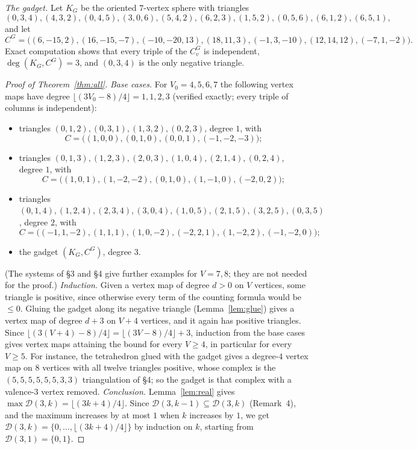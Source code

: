 \documentclass[11pt]{amsart}
\theoremstyle{remark}
\begin{document}
\emph{The gadget.} Let $K_G$ be the oriented $7$-vertex sphere with triangles
\[
(0,3,4),(4,3,2),(0,4,5),(3,0,6),(5,4,2),(6,2,3),(1,5,2),(0,5,6),(6,1,2),(6,5,1),
\]
and let
\[
C^G=\bigl((6,-15,2),(16,-15,-7),(-10,-20,13),(18,11,3),(-1,3,-10),(12,14,12),(-7,1,-2)\bigr).
\]
Exact computation shows that every triple of the $C^G_v$ is independent, $\deg(K_G,C^G)=3$, and $(0,3,4)$ is the only negative triangle.

\begin{proof}[Proof of Theorem~\ref{thm:all}]
\emph{Base cases.} For $V_0=4,5,6,7$ the following vertex maps have degree $\lfloor(3V_0-8)/4\rfloor=1,1,2,3$ (verified exactly; every triple of columns is independent):
\begin{itemize}
\item[$V_0=4$:] triangles $(0,1,2),(0,3,1),(1,3,2),(0,2,3)$, degree $1$, with
\[C=\bigl((1,0,0),(0,1,0),(0,0,1),(-1,-2,-3)\bigr);\]
\item[$V_0=5$:] triangles $(0,1,3),(1,2,3),(2,0,3),(1,0,4),(2,1,4),(0,2,4)$, degree $1$, with
\[C=\bigl((1,0,1),(1,-2,-2),(0,1,0),(1,-1,0),(-2,0,2)\bigr);\]
\item[$V_0=6$:] triangles $(0,1,4),(1,2,4),(2,3,4),(3,0,4),(1,0,5),(2,1,5),(3,2,5),(0,3,5)$, degree $2$, with
\[C=\bigl((-1,1,-2),(1,1,1),(1,0,-2),(-2,2,1),(1,-2,2),(-1,-2,0)\bigr);\]
\item[$V_0=7$:] the gadget $(K_G,C^G)$, degree $3$.
\end{itemize}
(The systems of \S3 and \S4 give further examples for $V=7,8$; they are not needed for the proof.)
\emph{Induction.} Given a vertex map of degree $d>0$ on $V$ vertices, some triangle is positive, since otherwise every term of the counting formula would be $\le0$. Gluing the gadget along its negative triangle (Lemma~\ref{lem:glue}) gives a vertex map of degree $d+3$ on $V+4$ vertices, and it again has positive triangles. Since $\lfloor(3(V+4)-8)/4\rfloor=\lfloor(3V-8)/4\rfloor+3$, induction from the base cases gives vertex maps attaining the bound for every $V\ge4$, in particular for every $V\ge5$. For instance, the tetrahedron glued with the gadget gives a degree-$4$ vertex map on $8$ vertices with all twelve triangles positive, whose complex is the $(5,5,5,5,5,5,3,3)$ triangulation of \S4; so the gadget is that complex with a valence-$3$ vertex removed.
\emph{Conclusion.} Lemma~\ref{lem:real} gives $\max\mathcal D(3,k)=\lfloor(3k+4)/4\rfloor$. Since $\mathcal D(3,k-1)\subseteq\mathcal D(3,k)$ (Remark~4), and the maximum increases by at most $1$ when $k$ increases by $1$, we get $\mathcal D(3,k)=\{0,\dots,\lfloor(3k+4)/4\rfloor\}$ by induction on $k$, starting from $\mathcal D(3,1)=\{0,1\}$.
\end{proof}
\end{document}
